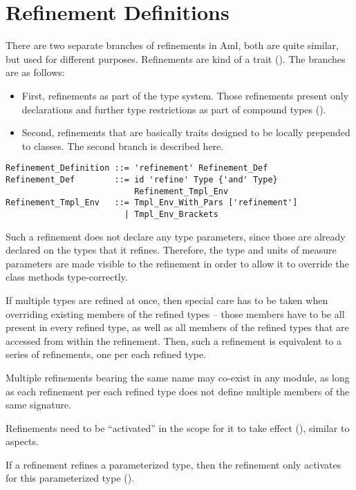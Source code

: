 \section{Refinement Definitions}
\label{sec:refinements}

There are two separate branches of refinements in Aml, both are quite similar, but used for different purposes. Refinements are kind of a trait (). The branches are as follows:
\begin{itemize}
  \item[] First, refinements as part of the type system. Those refinements present only declarations and further type restrictions as part of compound types ().

  \item[] Second, refinements that are basically traits designed to be locally prepended to classes. The second branch is described here. 
\end{itemize}

\grammar\begin{lstlisting}
Refinement_Definition ::= 'refinement' Refinement_Def
Refinement_Def        ::= id 'refine' Type {'and' Type} 
                          Refinement_Tmpl_Env
Refinement_Tmpl_Env   ::= Tmpl_Env_With_Pars ['refinement']
                        | Tmpl_Env_Brackets
\end{lstlisting}

Such a refinement does not declare any type parameters, since those are already declared on the types that it refines. Therefore, the type and units of measure parameters are made visible to the refinement in order to allow it to override the class methods type-correctly. 

If multiple types are refined at once, then special care has to be taken when overriding existing members of the refined types -- those members have to be all present in every refined type, as well as all members of the refined types that are accessed from within the refinement. Then, such a refinement is equivalent to a series of refinements, one per each refined type. 

Multiple refinements bearing the same name may co-exist in any module, as long as each refinement per each refined type does not define multiple members of the same signature. 

Refinements need to be ``activated'' in the scope for it to take effect (), similar to aspects.

If a refinement refines a parameterized type, then the refinement only activates for this parameterized type (). 

